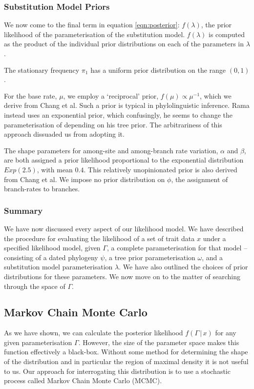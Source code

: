 \documentclass[10pt,journal,compsoc]{IEEEtran}
\begin{document}
\subsubsection{Substitution Model Priors}

We now come to the final term in equation \eqref{eqn:posterior}: $f(\lambda)$, the prior likelihood of the parameterisation of the substitution model. $f(\lambda)$ is computed as the product of the individual prior distributions on each of the parameters in $\lambda$.

The stationary frequency $\pi_1$ has a uniform prior distribution on the range $(0, 1)$.

For the base rate, $\mu$, we employ a `reciprocal' prior, $f(\mu) \propto \mu^{-1}$, which we derive from Chang et al. Such a prior is typical in phylolinguistic inference. Rama instead uses an exponential prior, which confusingly, he seems to change the parameterisation of depending on his tree prior. The arbitrariness of this approach dissuaded us from adopting it.

The shape parameters for among-site and among-branch rate variation, $\alpha$ and $\beta$, are both assigned a prior likelihood proportional to the exponential distribution $Exp(2.5)$, with mean $0.4$. This relatively unopinionated prior is also derived from Chang et al. We impose no prior distribution on $\phi$, the assignment of branch-rates to branches.

\subsubsection{Summary}

We have now discussed every aspect of our likelihood model. We have described the procedure for evaluating the likelihood of a set of trait data $x$ under a specified likelihood model, given $\Gamma$, a complete parameterisation for that model -- consisting of a dated phylogeny $\psi$, a tree prior parameterisation $\omega$, and a substitution model parameterisation $\lambda$. We have also outlined the choices of prior distributions for these parameters. We now move on to the matter of searching through the space of $\Gamma$.

\subsection{Markov Chain Monte Carlo}

As we have shown, we can calculate the posterior likelihood $f(\Gamma\,|\,x)$ for any given parameterisation $\Gamma$. However, the size of the parameter space makes this function effectively a black-box. Without some method for determining the shape of the distribution and in particular the region of maximal density it is not useful to us. Our approach for interrogating this distribution is to use a stochastic process called Markov Chain Monte Carlo (MCMC).
\end{document}
